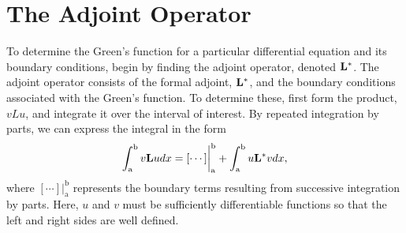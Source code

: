 \section{The Adjoint Operator}
To determine the Green's function for a particular differential equation and its boundary conditions, begin by finding the adjoint operator, denoted \(\mathcal{\mathrm{\bf{L^*}}  }\). The adjoint operator consists of the formal adjoint, \(\mathrm{\bf{L^*}}  \), and the boundary conditions associated with the Green's function. To determine these, first form the product, \(vLu\), and integrate it over the interval of interest. By repeated integration by parts, we can express the integral in the form
\begin{equation} \label{eq:adjoint}
	\int_\mathrm{a}^\mathrm{b} v \mathrm{\bf{L}} u dx = [\cdots]\biggr\rvert_\mathrm{a}^\mathrm{b} + \int_\mathrm{a}^\mathrm{b} u\mathrm{\bf{L^*}}  v dx,
\end{equation}
where \([\cdots]\biggr\rvert_\mathrm{a}^\mathrm{b}\) represents the boundary terms resulting from successive integration by parts. Here, \(u\) and \(v\) must be sufficiently differentiable functions so that the left and right sides are well defined. 

